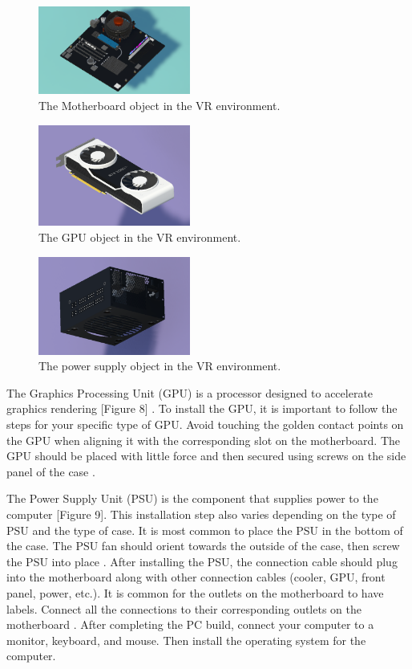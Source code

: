 \documentclass[10pt,twocolumn]{article}
\begin{document}
\begin{figure}
    \centering
    \includegraphics[width=5cm]{images/Motherboard.png}
    \caption{The Motherboard object in the VR environment.}
\end{figure}

\begin{figure}
    \centering
    \includegraphics[width=5cm]{images/GPU.png}
    \caption{The GPU object in the VR environment.}
\end{figure}

\begin{figure}
    \centering
    \includegraphics[width=5cm]{images/PowerSupply.png}
    \caption{The power supply object in the VR environment.}
\end{figure}

\par The Graphics Processing Unit (GPU) is a processor designed to accelerate graphics rendering [Figure 8] \cite{Fisher2021EverythingYouNeed}. To install the GPU, it is important to follow the steps for your specific type of GPU. Avoid touching the golden contact points on the GPU when aligning it with the corresponding slot on the motherboard. The GPU should be placed with little force and then secured using screws on the side panel of the case \cite{Sample2021HowToAssemble}. 

\par The Power Supply Unit (PSU) is the component that supplies power to the computer [Figure 9]. This installation step also varies depending on the type of PSU and the type of case. It is most common to place the PSU in the bottom of the case. The PSU fan should orient towards the outside of the case, then screw the PSU into place \cite{Sample2021HowToAssemble}. After installing the PSU, the connection cable should plug into the motherboard along with other connection cables (cooler, GPU, front panel, power, etc.). It is common for the outlets on the motherboard to have labels. Connect all the connections to their corresponding outlets on the motherboard \cite{Sample2021HowToAssemble}. After completing the PC build, connect your computer to a monitor, keyboard, and mouse. Then install the operating system for the computer. 
\end{document}
